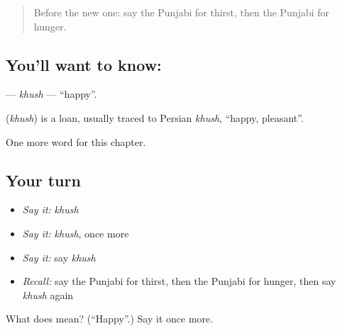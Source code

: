 \label{lesson:PA-C52-khush}



\begin{quote}
Before the new one: say the Punjabi for thirst, then the Punjabi for hunger.
\end{quote}

\subsection*{You'll want to know: }
\textbf{} — \emph{khush} — \textquotedblleft{}happy\textquotedblright{}.

\begin{cousinweb}
\textbf{} (\emph{khush}) is a loan, usually traced to Persian \emph{khush}, \textquotedblleft{}happy, pleasant\textquotedblright{}.
\end{cousinweb}

\begin{grammarlens}[title={What you've built}]
One more word for this chapter.
\end{grammarlens}

\subsection*{Your turn}
\begin{itemize}
\raggedright
  \item \emph{Say it:} \emph{khush}
  \item \emph{Say it:} \emph{khush}, once more
  \item \emph{Say it:} say \emph{khush}
  \item \emph{Recall:} say the Punjabi for thirst, then the Punjabi for hunger, then say \emph{khush} again
\end{itemize}

\begin{tcolorbox}[breakable,colback=teal!4,colframe=teal!35!black,title={Before you move on}]
What does  mean? (\textquotedblleft{}Happy\textquotedblright{}.) Say it once more.
\end{tcolorbox}
